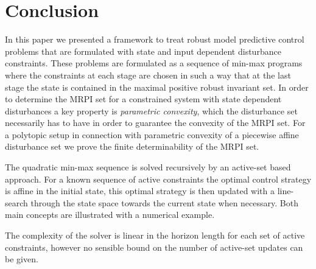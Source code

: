 \documentclass[journal]{IEEEtran}
\theoremstyle{remark}
\theoremstyle{definition}
\begin{document}
\section{Conclusion}\label{sec:conclusion}
In this paper we presented a framework to treat robust model predictive control problems that are formulated with state and input dependent disturbance constraints.
%
These problems are formulated as a sequence of min-max programs where the constraints at each stage are chosen in such a way that at the last stage the state is contained in the maximal positive robust invariant set.
%
In order to determine the MRPI set for a constrained system with state dependent disturbances a key property is \emph{parametric convexity}, which the disturbance set necessarily has to have in order to guarantee the convexity of the MRPI set.
%
For a polytopic setup in connection with parametric convexity of a piecewise affine disturbance set we prove the finite determinability of the MRPI set.
%
\par The quadratic min-max sequence is solved recursively by an active-set based approach. 
%
For a known sequence of active constraints the optimal control strategy is affine in the initial state, this optimal strategy is then updated with a line-search through the state space towards the current state when necessary.
%
Both main concepts are illustrated with a numerical example.
%
\par The complexity of the solver is linear in the horizon length for each set of active constraints, however no sensible bound on the number of active-set updates can be given. 
%






%
\end{document}
